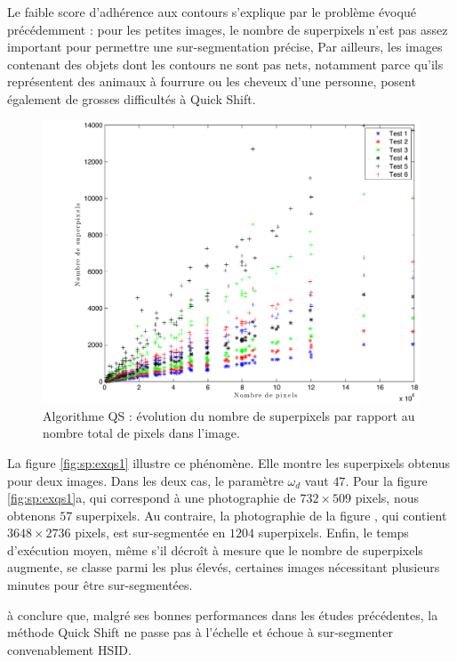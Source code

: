 Le faible score d'adhérence aux contours s'explique par le problème évoqué précédemment :  pour les petites images, le nombre de superpixels n'est pas assez important pour permettre une sur-segmentation précise,  Par ailleurs, les images contenant des objets dont les contours ne sont pas nets, notamment parce qu'ils représentent des animaux à fourrure ou les cheveux d'une personne, posent également de grosses difficultés à Quick Shift. 

\begin{figure}[htb]
	\centering	
			\includegraphics[width=\textwidth]{images/sur-segmentation/QS/spEvolution}
		 	\caption{Algorithme QS : évolution du nombre de superpixels par rapport au nombre total de pixels dans l'image.}
		 	\label{fig:sp:qs:nbsp_pixels}
\end{figure}

La figure \ref{fig:sp:exqs1} illustre ce phénomène. Elle montre les superpixels obtenus pour deux images. Dans les deux cas, le paramètre $\omega_{d}$ vaut $47$. Pour la figure \ref{fig:sp:exqs1}a, qui correspond à une photographie de $732 \times 509$ pixels, nous obtenons $57$ superpixels. Au contraire, la photographie de la figure , qui contient $3648 \times 2736$ pixels, est sur-segmentée en $1204$ superpixels. Enfin, le temps d'exécution moyen, même s'il décroît à mesure que le nombre de superpixels augmente, se classe parmi les plus élevés, certaines images nécessitant plusieurs minutes pour être sur-segmentées.

 à conclure que, malgré ses bonnes performances dans les études précédentes, la méthode Quick Shift ne passe pas à l'échelle et échoue à sur-segmenter convenablement HSID.


